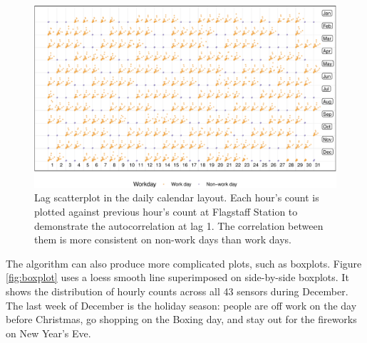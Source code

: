 \documentclass[12pt]{article}
\begin{document}
\begin{figure}

{\centering \includegraphics[width=\textwidth]{figure/scatterplot-1} 

}

\caption{Lag scatterplot in the daily calendar layout. Each hour's count is plotted against previous hour's count at Flagstaff Station to demonstrate the autocorrelation at lag 1. The correlation between them is more consistent on non-work days than work days.}\label{fig:scatterplot}
\end{figure}

The algorithm can also produce more complicated plots, such as boxplots.
Figure \ref{fig:boxplot} uses a loess smooth line superimposed on
side-by-side boxplots. It shows the distribution of hourly counts across
all 43 sensors during December. The last week of December is the holiday
season: people are off work on the day before Christmas, go shopping on
the Boxing day, and stay out for the fireworks on New Year's Eve.
\end{document}
